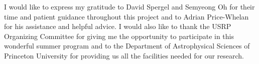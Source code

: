 \documentclass[a4paper,fleqn,usenatbib]{mnras}
\begin{document}
I would like to express my gratitude to David Spergel and Semyeong Oh for their time and patient guidance throughout this project and to Adrian Price-Whelan for his assistance and helpful advice. I would also like to thank the USRP Organizing Committee for giving me the opportunity to participate in this wonderful summer program and to the Department of Astrophysical Sciences of Princeton University for providing us all the facilities needed for our research.
 













\bsp	%
\label{lastpage}
\end{document}
